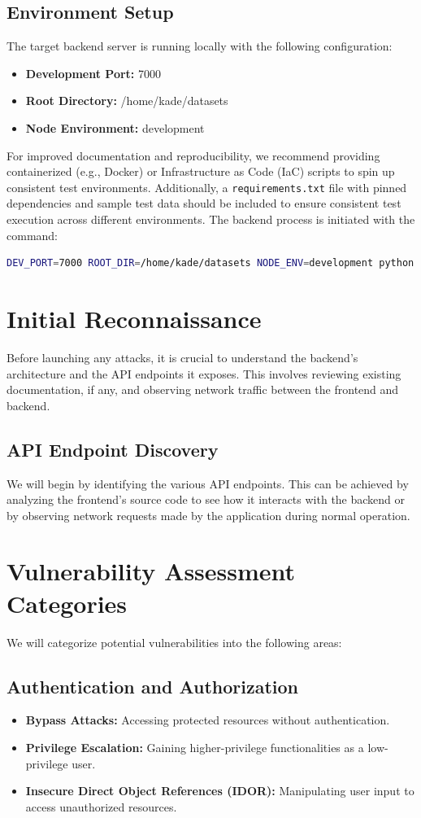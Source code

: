 \documentclass{article}
\begin{document}
\subsection{Environment Setup}
The target backend server is running locally with the following configuration:
\begin{itemize}
    \item \textbf{Development Port:} 7000
    \item \textbf{Root Directory:} /home/kade/datasets
    \item \textbf{Node Environment:} development
\end{itemize}
For improved documentation and reproducibility, we recommend providing containerized (e.g., Docker) or Infrastructure as Code (IaC) scripts to spin up consistent test environments. Additionally, a \texttt{requirements.txt} file with pinned dependencies and sample test data should be included to ensure consistent test execution across different environments.
The backend process is initiated with the command:
\begin{lstlisting}[language=bash, caption=Backend Startup Command]
DEV_PORT=7000 ROOT_DIR=/home/kade/datasets NODE_ENV=development python -m app
\end{lstlisting}

\section{Initial Reconnaissance}
Before launching any attacks, it is crucial to understand the backend's architecture and the API endpoints it exposes. This involves reviewing existing documentation, if any, and observing network traffic between the frontend and backend.

\subsection{API Endpoint Discovery}
We will begin by identifying the various API endpoints. This can be achieved by analyzing the frontend's source code to see how it interacts with the backend or by observing network requests made by the application during normal operation.

\section{Vulnerability Assessment Categories}
We will categorize potential vulnerabilities into the following areas:
\subsection{Authentication and Authorization}
\begin{itemize}
    \item \textbf{Bypass Attacks:} Accessing protected resources without authentication.
    \item \textbf{Privilege Escalation:} Gaining higher-privilege functionalities as a low-privilege user.
    \item \textbf{Insecure Direct Object References (IDOR):} Manipulating user input to access unauthorized resources.
\end{itemize}
\end{document}
